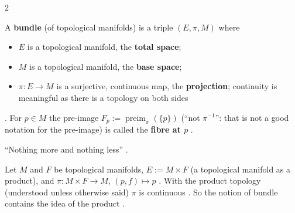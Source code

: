 \begin{paracol}{2}
\begin{definition}\label{def:mf-bundle}
A \textbf{bundle} (of topological manifolds) is a triple $(E,\pi,M)$ where
\begin{itemize}
  \item $E$ is a topological manifold, the \textbf{total space};
  \item $M$ is a topological manifold, the \textbf{base space};
  \item $\pi\colon E\to M$ is a surjective, continuous map, the \textbf{projection}; continuity is meaningful as there is a topology on both sides
\end{itemize}
. For $p\in M$ the pre-image $F_p:=\operatorname{preim}_\pi(\{p\})$ (``not $\pi^{-1}$'': that is not a good notation for the pre-image) is called the \textbf{fibre at $p$}
.
\end{definition}
``Nothing more and nothing less'' .

\begin{example}\label{ex:mf-product-bundle}
Let $M$ and $F$ be topological manifolds, $E:=M\times F$ (a topological manifold as a product), and $\pi\colon M\times F\to M$, $(p,f)\mapsto p$ . With the product topology
(understood unless otherwise said) $\pi$ is continuous . So the notion of bundle contains the idea of the product .
\end{example}


\end{paracol}
